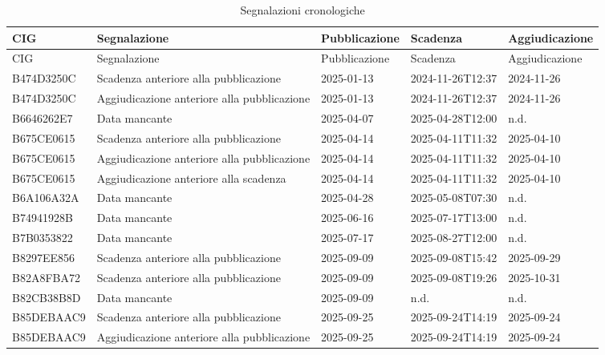 \begin{longtable}{p{2.3cm}p{4.7cm}p{2.5cm}p{3.2cm}p{2.5cm}}
\caption{Segnalazioni cronologiche}\\
\toprule
CIG & Segnalazione & Pubblicazione & Scadenza & Aggiudicazione \\
\midrule
\endfirsthead
\toprule
CIG & Segnalazione & Pubblicazione & Scadenza & Aggiudicazione \\
\midrule
\endhead
B474D3250C & Scadenza anteriore alla pubblicazione & 2025-01-13 & 2024-11-26T12:37 & 2024-11-26 \\
B474D3250C & Aggiudicazione anteriore alla pubblicazione & 2025-01-13 & 2024-11-26T12:37 & 2024-11-26 \\
B6646262E7 & Data mancante & 2025-04-07 & 2025-04-28T12:00 & n.d. \\
B675CE0615 & Scadenza anteriore alla pubblicazione & 2025-04-14 & 2025-04-11T11:32 & 2025-04-10 \\
B675CE0615 & Aggiudicazione anteriore alla pubblicazione & 2025-04-14 & 2025-04-11T11:32 & 2025-04-10 \\
B675CE0615 & Aggiudicazione anteriore alla scadenza & 2025-04-14 & 2025-04-11T11:32 & 2025-04-10 \\
B6A106A32A & Data mancante & 2025-04-28 & 2025-05-08T07:30 & n.d. \\
B74941928B & Data mancante & 2025-06-16 & 2025-07-17T13:00 & n.d. \\
B7B0353822 & Data mancante & 2025-07-17 & 2025-08-27T12:00 & n.d. \\
B8297EE856 & Scadenza anteriore alla pubblicazione & 2025-09-09 & 2025-09-08T15:42 & 2025-09-29 \\
B82A8FBA72 & Scadenza anteriore alla pubblicazione & 2025-09-09 & 2025-09-08T19:26 & 2025-10-31 \\
B82CB38B8D & Data mancante & 2025-09-09 & n.d. & n.d. \\
B85DEBAAC9 & Scadenza anteriore alla pubblicazione & 2025-09-25 & 2025-09-24T14:19 & 2025-09-24 \\
B85DEBAAC9 & Aggiudicazione anteriore alla pubblicazione & 2025-09-25 & 2025-09-24T14:19 & 2025-09-24 \\
\bottomrule
\end{longtable}
